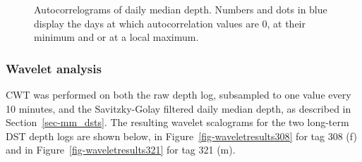 \documentclass[
  authoryear,
  review,
  3p]{elsarticle}
\begin{document}
\begin{figure}

\begin{minipage}[t]{\linewidth}

{\centering 


}

\end{minipage}%
\newline
\begin{minipage}[t]{\linewidth}

{\centering 


}

\end{minipage}%

\caption{\label{fig-acf}Autocorrelograms of daily median depth. Numbers
and dots in blue display the days at which autocorrelation values are 0,
at their minimum and or at a local maximum.}

\end{figure}

\hypertarget{wavelet-analysis}{%
\subsubsection{Wavelet analysis}\label{wavelet-analysis}}

CWT was performed on both the raw depth log, subsampled to one value
every 10 minutes, and the Savitzky-Golay filtered daily median depth, as
described in Section~\ref{sec-mm_dsts}. The resulting wavelet scalograms
for the two long-term DST depth logs are shown below, in
Figure~\ref{fig-waveletresults308} for tag 308 (f) and in
Figure~\ref{fig-waveletresults321} for tag 321 (m).
\end{document}
